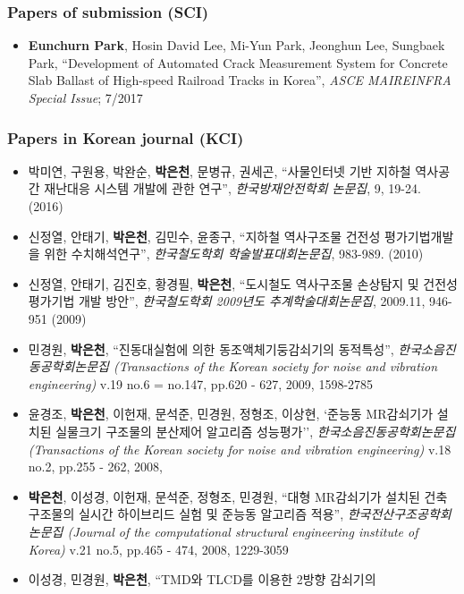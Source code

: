 \subsubsection*{Papers of submission (SCI)}
\begin{itemize}
\item
  \textbf{Eunchurn Park}, Hosin David Lee, Mi-Yun Park, Jeonghun Lee, Sungbaek Park, ``Development of Automated Crack Measurement System for Concrete Slab Ballast of High-speed Railroad Tracks in Korea'', \emph{ASCE MAIREINFRA Special Issue}; 7/2017
\end{itemize}

\subsubsection*{Papers in Korean journal (KCI)}
\begin{itemize}
\item
  박미연, 구원용, 박완순, \textbf{박은천}, 문병규, 권세곤, ``사물인터넷 기반 지하철 역사공간 재난대응 시스템 개발에 관한 연구'', \emph{한국방재안전학회 논문집}, 9, 19-24. (2016)
\item
 신정열, 안태기, \textbf{박은천}, 김민수, 윤종구, ``지하철 역사구조물 건전성 평가기법개발을 위한 수치해석연구'', \emph{한국철도학회 학술발표대회논문집}, 983-989. (2010)
\item
  신정열, 안태기, 김진호, 황경필, \textbf{박은천}, ``도시철도 역사구조물 손상탐지 및 건전성 평가기법 개발 방안'', \emph{한국철도학회 2009년도 추계학술대회논문집}, 2009.11, 946-951 (2009)
\item
  민경원, \textbf{박은천}, ``진동대실험에 의한
  동조액체기둥감쇠기의 동적특성'', \emph{한국소음진동공학회논문집
  (Transactions of the Korean society for noise and vibration
  engineering)} v.19 no.6 = no.147, pp.620 - 627, 2009, 1598-2785
\item
  윤경조, \textbf{박은천}, 이헌재, 문석준, 민경원, 정형조, 이상현, `준능동 MR감쇠기가 설치된 실물크기 구조물의 분산제어 알고리즘 성능평가'', \emph{한국소음진동공학회논문집
  (Transactions of the Korean society for noise and vibration
  engineering)} v.18 no.2, pp.255 - 262, 2008,
\item
  \textbf{박은천}, 이성경, 이헌재, 문석준, 정형조, 민경원, ``대형
  MR감쇠기가 설치된 건축구조물의 실시간 하이브리드 실험 및 준능동
  알고리즘 적용'', \emph{한국전산구조공학회논문집 (Journal of the
  computational structural engineering institute of Korea)} v.21 no.5,
  pp.465 - 474, 2008, 1229-3059
\item
  이성경, 민경원, \textbf{박은천}, ``TMD와 TLCD를 이용한 2방향 감쇠기의

\end{itemize}
